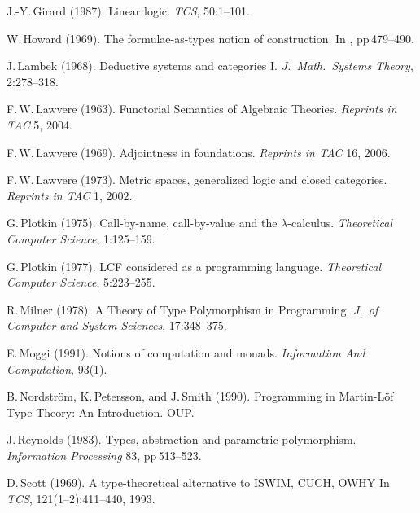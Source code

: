 \documentclass[11pt,twocolumn]{article}
\begin{document}
{\begin{thebibliography}{00}
J.-Y.\,Girard (1987).
\newblock Linear logic.
\newblock \emph{TCS}, 50:1--101.

W.\,Howard (1969).
\newblock The formulae-as-types notion of construction.
\newblock In \emph{\cite{ToHBCurry}}, pp\,479--490. 

J.\,Lambek (1968).
\newblock Deductive systems and categories I.
\newblock \emph{J.\ Math.\ Systems Theory}, 2:278--318.

F.\,W.\,Lawvere (1963). %
\newblock Functorial Semantics of Algebraic Theories. %
\newblock \emph{Reprints in TAC} 5, 2004.

F.\,W.\,Lawvere (1969).
\newblock Adjointness in foundations.
\newblock \emph{Reprints in TAC} 16, 2006.

F.\,W.\,Lawvere (1973).
\newblock Metric spaces, generalized logic and closed categories.
\newblock \emph{Reprints in TAC} 1, 2002.

G.\,Plotkin (1975).
\newblock Call-by-name, call-by-value and the \mbox{$\lambda$-calculus}.
\newblock \emph{Theoretical Computer Science}, 1:125--159.

G.\,Plotkin (1977).
\newblock LCF considered as a programming language.
\newblock \emph{Theoretical Computer Science}, 5:223--255.

R.\,Milner (1978).
\newblock A Theory of Type Polymorphism in Programming.
\newblock \emph{J.\ of Computer and System Sciences}, 17:348--375.

E.\,Moggi (1991).
\newblock Notions of computation and monads. 
\newblock \emph{Information And Computation}, 93(1).

B.\,Nordstr\"om, K.\,Petersson, and J.\,Smith (1990).
\newblock Programming in Martin-L\"of Type Theory: An Introduction.
\newblock OUP.

J.\,Reynolds (1983).
\newblock Types, abstraction and parametric polymorphism.
\newblock \emph{Information Processing} 83, pp\,513--523.

D.\,Scott (1969).
\newblock A type-theoretical alternative to ISWIM, CUCH, OWHY
\newblock In \emph{TCS}, 121(1--2):411--440, 1993.


\end{thebibliography}}
\end{document}
